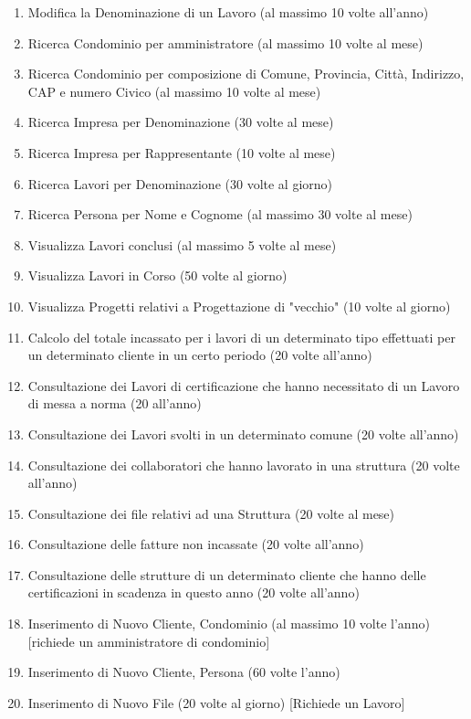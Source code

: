 \documentclass{elegantbook}
\begin{document}
\begin{enumerate}
		\item Modifica la Denominazione di un Lavoro (al massimo 10 volte all'anno)
		\item Ricerca Condominio per amministratore (al massimo 10 volte al mese)
		\item Ricerca Condominio per composizione di Comune, Provincia, Città, Indirizzo, CAP e numero Civico (al massimo 10 volte al mese)
		\item Ricerca Impresa per Denominazione (30 volte al mese)
		\item Ricerca Impresa per Rappresentante (10 volte al mese)
		\item Ricerca Lavori per Denominazione (30 volte al giorno)
		\item Ricerca Persona per Nome e Cognome (al massimo 30 volte al mese)
		\item Visualizza Lavori conclusi (al massimo 5 volte al mese)
		\item Visualizza Lavori in Corso (50 volte al giorno)
		\item Visualizza Progetti relativi a Progettazione di "vecchio" (10 volte al giorno)
                \item Calcolo del totale incassato per i lavori di un determinato tipo effettuati per un determinato cliente in un certo periodo (20 volte all'anno)
                \item Consultazione dei Lavori di certificazione che hanno necessitato di un Lavoro di messa a norma (20 all'anno)
                \item Consultazione dei Lavori svolti in un determinato comune (20 volte all'anno) 
                \item Consultazione dei collaboratori che hanno lavorato in una struttura (20 volte all'anno)
                \item Consultazione dei file relativi ad una Struttura (20 volte al mese)
                \item Consultazione delle fatture non incassate (20 volte all'anno)
                \item Consultazione delle strutture di un determinato cliente che hanno delle certificazioni in scadenza in questo anno (20 volte all'anno)
                \item Inserimento di Nuovo Cliente, Condominio (al massimo 10 volte l'anno) [richiede un amministratore di condominio]
                \item Inserimento di Nuovo Cliente, Persona (60 volte l'anno) 
                \item Inserimento di Nuovo File (20 volte al giorno) [Richiede un Lavoro]

\end{enumerate}
\end{document}
